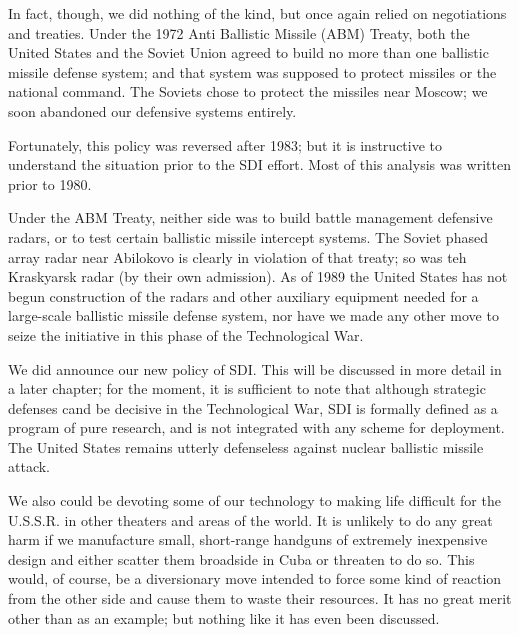 In fact, though, we did nothing of the kind, but once again relied on negotiations and treaties. Under the 1972 Anti Ballistic Missile (ABM) Treaty, both the United States and the Soviet Union agreed to build no more than one ballistic missile defense system; and that system was supposed to protect missiles or the national command. The Soviets chose to protect the missiles near Moscow; we soon abandoned our defensive systems entirely.

\begin{mdframed}[backgroundcolor=black!10]
Fortunately, this policy was reversed after 1983; but it is instructive to understand the situation prior to the SDI effort. Most of this analysis was written prior to 1980.
\end{mdframed}

Under the ABM Treaty, neither side was to build battle management defensive radars, or to test certain ballistic missile intercept systems. The Soviet phased array radar near Abilokovo is clearly in violation of that treaty; so was teh Kraskyarsk radar (by their own admission). As of 1989 the United States has not begun construction of the radars and other auxiliary equipment needed for a large-scale ballistic missile defense system, nor have we made any other move to seize the initiative in this phase of the Technological War.

We did announce our new policy of SDI. This will be discussed in more detail in a later chapter; for the moment, it is sufficient to note that although strategic defenses cand be decisive in the Technological War, SDI is formally defined as a program of pure research, and is not integrated with any scheme for deployment. The United States remains utterly defenseless against nuclear ballistic missile attack.

We also could be devoting some of our technology to making life difficult for the U.S.S.R. in other theaters and areas of the world. It is unlikely to do any great harm if we manufacture small, short-range handguns of extremely inexpensive design and either scatter them broadside in Cuba or threaten to do so. This would, of course, be a diversionary move intended to force some kind of reaction from the other side and cause them to waste their resources. It has no great merit other than as an example; but nothing like it has even been discussed.

